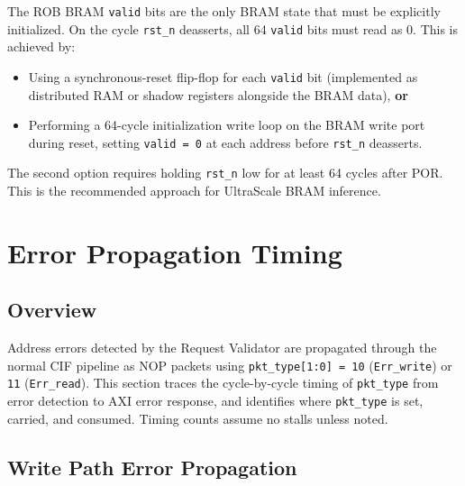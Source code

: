 \documentclass[11pt,a4paper]{article}
\begin{document}
The ROB BRAM \texttt{valid} bits are the only BRAM state that must be
explicitly initialized. On the cycle \texttt{rst\_n} deasserts, all 64
\texttt{valid} bits must read as 0. This is achieved by:
\begin{itemize}
  \item Using a synchronous-reset flip-flop for each \texttt{valid} bit
        (implemented as distributed RAM or shadow registers alongside the BRAM
        data), \textbf{or}
  \item Performing a 64-cycle initialization write loop on the BRAM write port
        during reset, setting \texttt{valid = 0} at each address before
        \texttt{rst\_n} deasserts.
\end{itemize}
The second option requires holding \texttt{rst\_n} low for at least 64 cycles
after POR. This is the recommended approach for UltraScale BRAM inference.

\newpage
\section{Error Propagation Timing}

\subsection{Overview}

Address errors detected by the Request Validator are propagated through the
normal CIF pipeline as NOP packets using \texttt{pkt\_type[1:0] = 10}
(\texttt{Err\_write}) or \texttt{11} (\texttt{Err\_read}). This section traces
the cycle-by-cycle timing of \texttt{pkt\_type} from error detection to AXI
error response, and identifies where \texttt{pkt\_type} is set, carried, and
consumed. Timing counts assume no stalls unless noted.

\subsection{Write Path Error Propagation}
\end{document}
